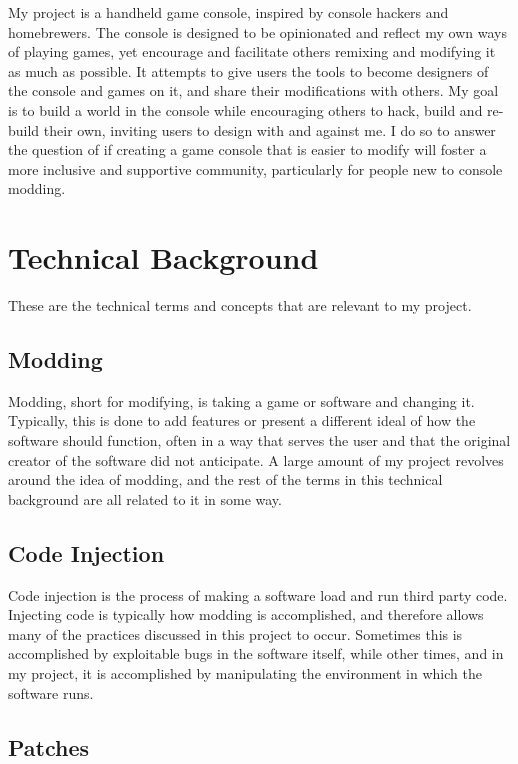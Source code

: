 \documentclass[10pt,twocolumn]{article}
\begin{document}
My project is a handheld game console, inspired by console hackers and
homebrewers. The console is designed to be opinionated and reflect my own ways
of playing games, yet encourage and facilitate others remixing and modifying it
as much as possible. It attempts to give users the tools to become designers of
the console and games on it, and share their modifications with others. My goal
is to build a world in the console while encouraging others to hack, build
and re-build their own, inviting users to design with and against me. I do so
to answer the question of if creating a game console that is easier to modify
will foster a more inclusive and supportive community, particularly for people
new to console modding.

\section{Technical Background}

These are the technical terms and concepts that are relevant to my project.

\subsection{Modding}

Modding, short for modifying, is taking a game or software and changing it.
Typically, this is done to add features or present a different ideal of how the
software should function, often in a way that serves the user and that the
original creator of the software did not anticipate. A large amount of my
project revolves around the idea of modding, and the rest of the terms in this
technical background are all related to it in some way.

\subsection{Code Injection}

Code injection is the process of making a software load and run third party
code. Injecting code is typically how modding is accomplished, and therefore
allows many of the practices discussed in this project to occur. Sometimes this
is accomplished by exploitable bugs in the software itself, while other times,
and in my project, it is accomplished by manipulating the environment in which
the software runs.

\subsection{Patches}
\end{document}
